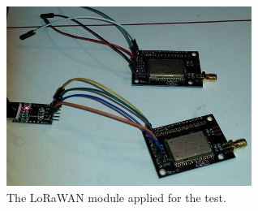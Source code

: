 \documentclass[b5paper,12pt]{report}
\theoremstyle{definition}
\begin{document}
\begin{figure}[ht!]
\centerline{
\includegraphics[width=8cm]{img/lorawan_hw.jpg}}
\caption{The LoRaWAN module applied for the test.}
\label{lorahw}
\end{figure}

\begin{figure}[!ht]
\begin{minipage}{.54\linewidth}
\centering
{}
\end{minipage}
\begin{minipage}{.4\linewidth}
\centering

\end{minipage}
\end{figure}
\end{document}
